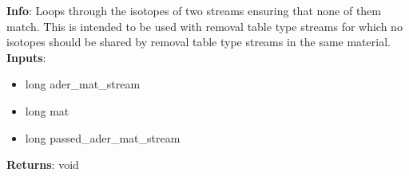 \textbf{Info}: Loops through the isotopes of two streams ensuring that none
of them match. This is intended to be used with removal table type streams
for which no isotopes should be shared by removal table type streams in the
same material. \\

\noindent \textbf{Inputs}:
\begin{itemize}
\item{long ader\_mat\_stream}
\item{long mat}
\item{long passed\_ader\_mat\_stream}
\end{itemize}

\noindent \textbf{Returns}: void
